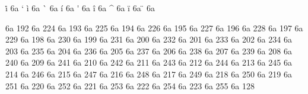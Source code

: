\let\i=\dotlessi \let\j=\dotlessj
\accentdef  \. i     6a  `\i
\accentdef  \` i     6a  { \i}
\accentdef  \` {\i}  6a  { \i}
\accentdef  \' i     6a  { \i}
\accentdef  \' {\i}  6a  { \i}
\accentdef  \^ i     6a  { \i}
\accentdef  \^ {\i}  6a  { \i}
\accentdef  \" i     6a  { \i}
\accentdef  \" {\i}  6a  { \i}

\characterdef \CYRA      6a   192
\characterdef \cyra      6a   224
\characterdef \CYRB      6a   193
\characterdef \cyrb      6a   225
\characterdef \CYRV      6a   194
\characterdef \cyrv      6a   226
\characterdef \CYRG      6a   195
\characterdef \cyrg      6a   227
\characterdef \CYRD      6a   196
\characterdef \cyrd      6a   228
\characterdef \CYRE      6a   197
\characterdef \cyre      6a   229
\characterdef \CYRZH     6a   198
\characterdef \cyrzh     6a   230
\characterdef \CYRZ      6a   199
\characterdef \cyrz      6a   231
\characterdef \CYRI      6a   200
\characterdef \cyri      6a   232
\characterdef \CYRISHRT  6a   201
\characterdef \cyrishrt  6a   233
\characterdef \CYRK      6a   202
\characterdef \cyrk      6a   234
\characterdef \CYRL      6a   203
\characterdef \cyrl      6a   235
\characterdef \CYRM      6a   204
\characterdef \cyrm      6a   236
\characterdef \CYRN      6a   205
\characterdef \cyrn      6a   237
\characterdef \CYRO      6a   206
\characterdef \cyro      6a   238
\characterdef \CYRP      6a   207
\characterdef \cyrp      6a   239
\characterdef \CYRR      6a   208
\characterdef \cyrr      6a   240
\characterdef \CYRS      6a   209
\characterdef \cyrs      6a   241
\characterdef \CYRT      6a   210
\characterdef \cyrt      6a   242
\characterdef \CYRU      6a   211
\characterdef \cyru      6a   243
\characterdef \CYRF      6a   212
\characterdef \cyrf      6a   244
\characterdef \CYRH      6a   213
\characterdef \cyrh      6a   245
\characterdef \CYRC      6a   214
\characterdef \cyrc      6a   246
\characterdef \CYRCH     6a   215
\characterdef \cyrch     6a   247
\characterdef \CYRSH     6a   216
\characterdef \cyrsh     6a   248
\characterdef \CYRSHCH   6a   217
\characterdef \cyrshch   6a   249
\characterdef \CYRHRDSN  6a   218
\characterdef \cyrhrdsn  6a   250
\characterdef \CYRERY    6a   219
\characterdef \cyrery    6a   251
\characterdef \CYRSFTSN  6a   220
\characterdef \cyrsftsn  6a   252
\characterdef \CYREREV   6a   221
\characterdef \cyrerev   6a   253
\characterdef \CYRYU     6a   222
\characterdef \cyryu     6a   254
\characterdef \CYRYA     6a   223
\characterdef \cyrya     6a   255
\characterdef \CYRGUP    6a   128
